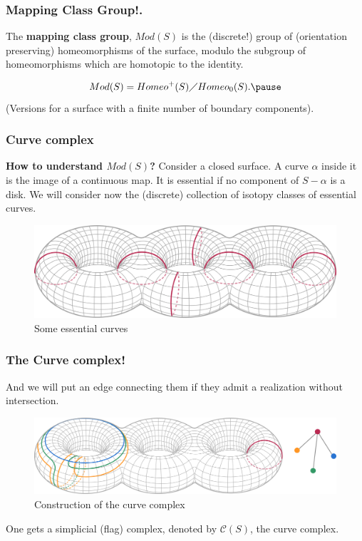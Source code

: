 \documentclass[handout]{beamer}
\theoremstyle{plain}
\begin{document}
\begin{frame}
\begin{definition}\frametitle{Mapping Class Group!.}
The  \textbf{mapping class group}, $Mod(S)$ is the  (discrete!) group  of  (orientation preserving) homeomorphisms of  the  surface, modulo  the subgroup of homeomorphisms  which  are  homotopic  to  the  identity. \pause

$$ Mod(S)= Homeo^{+}(S)\diagup Homeo_{0}(S). \pause $$
(Versions for  a  surface with  a  finite  number  of boundary  components). 
 
 \end{definition}
 \end{frame}
 


\begin{frame}\frametitle{Curve complex }
\textbf{How to understand $Mod(S)$? }\pause
Consider a  closed  surface. A  curve  $\alpha$ inside  it  is  the  image of  a  continuous  map. It  is  essential if no component of $S-\alpha$ is  a  disk.      
We  will  consider   now  the (discrete) collection of isotopy classes   of  essential  curves.

\begin{figure}[h!]
	\centering
	\includegraphics[scale=0.2]{CHARLA_STOCHASTIC_TOPOLOGY_MCG_CIMATNOVEMBER_2018/Pantalones.png}
	\caption{Some essential curves}
\end{figure}

\end{frame}
\begin{frame} \frametitle{The  Curve  complex!}

And  we  will  put  an edge  connecting  them  if   they  admit  a realization  without  intersection. 

\begin{figure}[h!]
	\centering
	\includegraphics[scale=0.25]{CHARLA_STOCHASTIC_TOPOLOGY_MCG_CIMATNOVEMBER_2018/Locally-infinite.png}
	\caption{Construction of the curve complex}
\end{figure}

One  gets  a simplicial  (flag) complex,  denoted  by $\mathcal{C}(S)$, the  curve  complex. \pause  
\end{frame}
\end{document}
